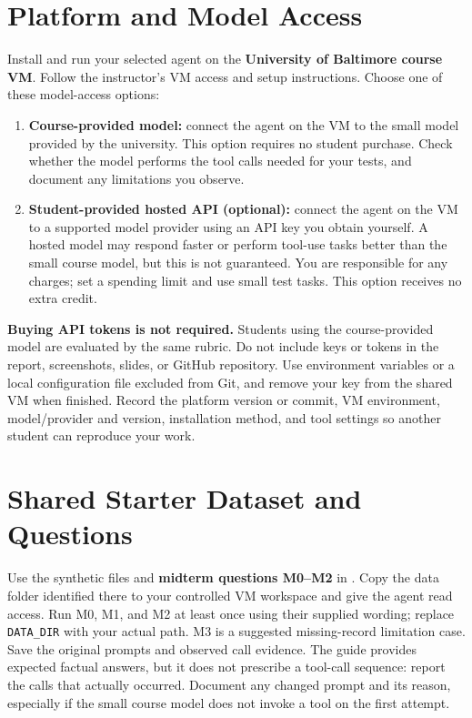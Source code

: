 \documentclass[11pt]{article}
\begin{document}
\section{Platform and Model Access}
Install and run your selected agent on the \textbf{University of Baltimore course VM}. Follow the instructor's VM access and setup instructions. Choose one of these model-access options:
\begin{enumerate}
  \item \textbf{Course-provided model:} connect the agent on the VM to the small model provided by the university. This option requires no student purchase. Check whether the model performs the tool calls needed for your tests, and document any limitations you observe.
  \item \textbf{Student-provided hosted API (optional):} connect the agent on the VM to a supported model provider using an API key you obtain yourself. A hosted model may respond faster or perform tool-use tasks better than the small course model, but this is not guaranteed. You are responsible for any charges; set a spending limit and use small test tasks. This option receives no extra credit.
\end{enumerate}
\textbf{Buying API tokens is not required.} Students using the course-provided model are evaluated by the same rubric. Do not include keys or tokens in the report, screenshots, slides, or GitHub repository. Use environment variables or a local configuration file excluded from Git, and remove your key from the shared VM when finished. Record the platform version or commit, VM environment, model/provider and version, installation method, and tool settings so another student can reproduce your work.

\section{Shared Starter Dataset and Questions}
Use the synthetic files and \textbf{midterm questions M0--M2} in . Copy the data folder identified there to your controlled VM workspace and give the agent read access. Run M0, M1, and M2 at least once using their supplied wording; replace \texttt{DATA\_DIR} with your actual path. M3 is a suggested missing-record limitation case. Save the original prompts and observed call evidence. The guide provides expected factual answers, but it does not prescribe a tool-call sequence: report the calls that actually occurred. Document any changed prompt and its reason, especially if the small course model does not invoke a tool on the first attempt.
\end{document}
